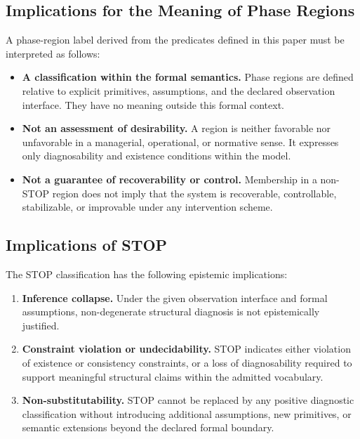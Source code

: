 \subsection{Implications for the Meaning of Phase Regions}
\label{subsec:imp-phase-regions}

A phase-region label derived from the predicates defined in this paper must be
interpreted as follows:

\begin{itemize}
  \item \textbf{A classification within the formal semantics.}
  Phase regions are defined relative to explicit primitives, assumptions, and
  the declared observation interface.
  They have no meaning outside this formal context.

  \item \textbf{Not an assessment of desirability.}
  A region is neither favorable nor unfavorable in a managerial, operational,
  or normative sense.
  It expresses only diagnosability and existence conditions within the model.

  \item \textbf{Not a guarantee of recoverability or control.}
  Membership in a non-STOP region does not imply that the system is recoverable,
  controllable, stabilizable, or improvable under any intervention scheme.
\end{itemize}

\subsection{Implications of STOP}
\label{subsec:imp-stop}

The STOP classification has the following epistemic implications:

\begin{enumerate}
  \item \textbf{Inference collapse.}
  Under the given observation interface and formal assumptions, non-degenerate
  structural diagnosis is not epistemically justified.

  \item \textbf{Constraint violation or undecidability.}
  STOP indicates either violation of existence or consistency constraints, or a
  loss of diagnosability required to support meaningful structural claims within
  the admitted vocabulary.

  \item \textbf{Non-substitutability.}
  STOP cannot be replaced by any positive diagnostic classification without
  introducing additional assumptions, new primitives, or semantic extensions
  beyond the declared formal boundary.
\end{enumerate}


